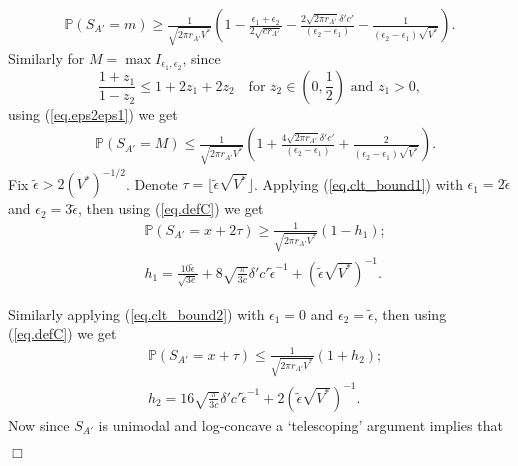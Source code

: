 \documentclass{article}
\newenvironment{proofof}[1]{\noindent {\bf Proof of #1}}{\hspace*{\fill}$\Box$}
\newcommand{\pr}{\mathbb P}
\begin{document}
\begin{proofof}{Lemma~\ref{lem.clt}}
        \begin{align} 
            \pr(S_{A'} = m) \ge \frac {1} {\sqrt {2 \pi r_{A'} V^*}} (1 - \frac {\epsilon_1 + \epsilon_2} {2 \sqrt {e r_{A'}}} - \frac {2 \sqrt{2 \pi r_{A'}} \delta'c'} {(\epsilon_2 - \epsilon_1)} - \frac 1 {(\epsilon_2 - \epsilon_1) \sqrt{V^*}}) 
        . \label{eq.clt_bound1}
    \end{align}
    Similarly for $M=\max I_{\epsilon_1, \epsilon_2}$, since  
    \begin{equation}\label{eq.z1z2}
        \frac {1+z_1} {1-z_2} \le 1 + 2 z_1 + 2z_2 \quad\mbox{for }  z_2 \in (0, \frac 1 2) \mbox{ and }z_1 > 0,
    \end{equation}
    using (\ref{eq.eps2eps1}) we get 
    \begin{align} \label{eq.clt_bound2}
        &\pr(S_{A'} = M) \le \frac {1} {\sqrt { 2 \pi r_{A'} V^*}} (1  + \frac {4 \sqrt {2 \pi r_{A'}} \delta'c'}{(\epsilon_2 - \epsilon_1)}  + \frac 2 {(\epsilon_2 - \epsilon_1) \sqrt{V^*}}).
    \end{align}
    Fix $\tilde{\epsilon} >  2 (V^*)^{-1/2}$.
    Denote $\tau=\lfloor \tilde{\epsilon} \sqrt{V^*} \rfloor$.
Applying (\ref{eq.clt_bound1}) with $\epsilon_1 = 2\tilde{\epsilon}$ and $\epsilon_2= 3\tilde{\epsilon}$, then using (\ref{eq.defC}) we get \begin{align*}
        &
        \pr(S_{A'} = x + 2 \tau) 
\ge  \frac {1} {\sqrt {2 \pi r_{A'} V^*}} (1 - h_1); 
        \\ & 
        h_1 =   \frac {10\tilde{\epsilon}} {\sqrt{3 e}} + 8 \sqrt{\frac \pi {3c} } \delta'c' \tilde{\epsilon}^{-1} + (\tilde{\epsilon} \sqrt{V^*})^{-1}.
\end{align*}


    Similarly applying (\ref{eq.clt_bound2}) with $\epsilon_1 = 0$ and $\epsilon_2=\tilde{\epsilon}$, then using (\ref{eq.defC}) we get \begin{align*}
        &
        \pr(S_{A'} = x + \tau)  \le \frac {1} {\sqrt { 2 \pi r_{A'} V^*}} (1 + h_2);
        \\ &
h_2  = 16 \sqrt{\frac \pi {3c} }\delta'c' \tilde{\epsilon}^{-1}  + 2 (\tilde{\epsilon}\sqrt{V^*})^{-1}.
\end{align*}
Now since $S_{A'}$ is unimodal and log-concave a `telescoping' argument implies that












\end{proofof}
\end{document}
